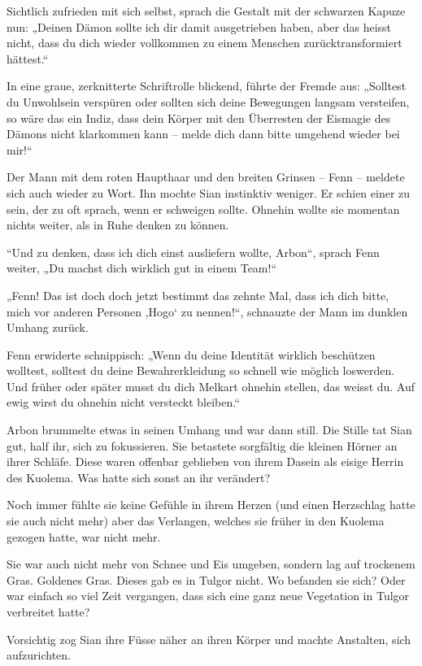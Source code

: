 \documentclass[10pt, a4paper, oneside]{book}
\begin{document}
Sichtlich zufrieden mit sich selbst, sprach die Gestalt mit der schwarzen Kapuze nun: „Deinen Dämon sollte ich dir damit ausgetrieben haben, aber das heisst nicht, dass du dich wieder vollkommen zu einem Menschen zurücktransformiert hättest.“

In eine graue, zerknitterte Schriftrolle blickend, führte der Fremde aus: „Solltest du Unwohlsein verspüren oder sollten sich deine Bewegungen langsam versteifen, so wäre das ein Indiz, dass dein Körper mit den Überresten der Eismagie des Dämons nicht klarkommen kann – melde dich dann bitte umgehend wieder bei mir!“

Der Mann mit dem roten Haupthaar und den breiten Grinsen – Fenn – meldete sich auch wieder zu Wort. Ihn mochte Sian instinktiv weniger. Er schien einer zu sein, der zu oft sprach, wenn er schweigen sollte. Ohnehin wollte sie momentan nichts weiter, als in Ruhe denken zu können.

“Und zu denken, dass ich dich einst ausliefern wollte, Arbon“, sprach Fenn weiter, „Du machst dich wirklich gut in einem Team!“ 

„Fenn! Das ist doch doch jetzt bestimmt das zehnte Mal, dass ich dich bitte, mich vor anderen Personen ‚Hogo‘ zu nennen!“, schnauzte der Mann im dunklen Umhang zurück. 

Fenn erwiderte schnippisch: „Wenn du deine Identität wirklich beschützen wolltest, solltest du deine Bewahrerkleidung so schnell wie möglich loswerden. Und früher oder später musst du dich Melkart ohnehin stellen, das weisst du. Auf ewig wirst du ohnehin nicht versteckt bleiben.“

Arbon brummelte etwas in seinen Umhang und war dann still. Die Stille tat Sian gut, half ihr, sich zu fokussieren. Sie betastete sorgfältig die kleinen Hörner an ihrer Schläfe. Diese waren offenbar geblieben von ihrem Dasein als eisige Herrin des Kuolema. Was hatte sich sonst an ihr verändert? 

Noch immer fühlte sie keine Gefühle in ihrem Herzen (und einen Herzschlag hatte sie auch nicht mehr) aber das Verlangen, welches sie früher in den Kuolema gezogen hatte, war nicht mehr. 

Sie war auch nicht mehr von Schnee und Eis umgeben, sondern lag auf trockenem Gras. Goldenes Gras. Dieses gab es in Tulgor nicht. Wo befanden sie sich? Oder war einfach so viel Zeit vergangen, dass sich eine ganz neue Vegetation in Tulgor verbreitet hatte?

Vorsichtig zog Sian ihre Füsse näher an ihren Körper und machte Anstalten, sich aufzurichten.
\end{document}
